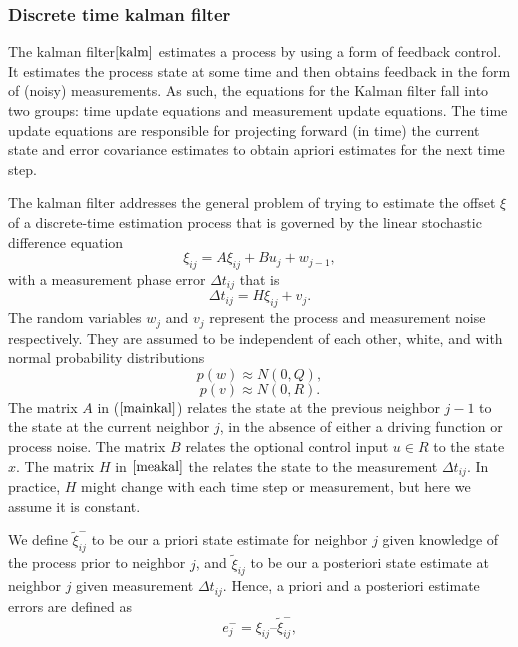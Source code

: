 \documentclass[a4paper,10pt]{report}
\begin{document}
\subsubsection{Discrete time kalman filter}
The kalman filter$\cite{kalm}$ estimates a process by using a form of feedback
control. It estimates the process state at some time and
then obtains feedback in the form of (noisy) measurements. As such,
the equations for the Kalman filter fall into two groups: time
update equations and measurement update equations. The time update
equations are responsible for projecting forward (in time) the
current state and error covariance estimates to obtain apriori
estimates for the next time step.
\par
The kalman filter addresses the general problem of trying to
estimate the offset $\xi$ of a discrete-time estimation process that is
governed by the linear stochastic difference equation
\begin{equation}
 \xi_{ij} = A\xi_{ij} + Bu_j + w_{j-1} , \label{mainkal}
\end{equation}
with a measurement phase error $\Delta t_{ij}$ that is
\begin{equation}
 \Delta t_{ij} = H\xi_{ij} + v_j. \label{meakal}
\end{equation}
The random variables $w_j$ and $v_j$ represent the process and
measurement noise respectively. They are assumed to be
independent of each other, white, and with normal probability
distributions
\begin{equation}
 p(w) \approx N(0,Q),
\end{equation}
\begin{equation}
 p(v) \approx N(0,R).
\end{equation}
The matrix $A$ in ($\ref{mainkal}$) relates the state at
the previous neighbor $j-1$ to the state at the current neighbor $j$,
in the absence of either a driving function or process noise. The matrix $B$ relates the optional
control input $u \in R$ to the state $x$. The matrix $H$
in $\ref{meakal}$ the relates the state to the measurement $\Delta t_{ij}$. In
practice, $H$ might change with each time step or measurement, but
here we assume it is constant.
\par
We define $\tilde \xi_{ij}^-$ to be our a priori state estimate for
neighbor $j$ given knowledge of the process prior to neighbor $j$, and
$\tilde \xi_{ij}$ to be our a posteriori state estimate at neighbor $j$
given measurement $\Delta t_{ij}$. Hence, a priori and a posteriori estimate
errors are defined as
\begin{equation}
e_j^- = \xi_{ij} – \tilde \xi_{ij}^- ,
\end{equation}
\end{document}
